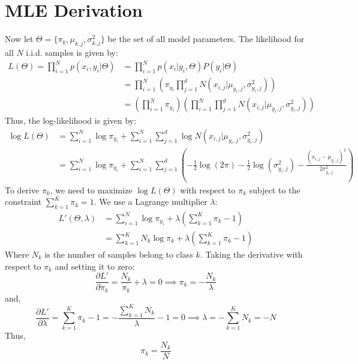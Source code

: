 \documentclass[11pt, a4paper, oneside]{memoir}
\begin{document}
\section{MLE Derivation}
Now let $\Theta = \{\pi_k, \mu_{k,j}, \sigma^2_{k,j}\}$ be the set of all model parameters.
The likelihood for all $N$ i.i.d. samples is given by:
\begin{align*}
  L(\Theta) = \prod_{i=1}^{N} p(x_i, y_i | \Theta) &= \prod_{i=1}^{N} p(x_i | y_i, \Theta) P(y_i | \Theta) \\
  &= \prod_{i=1}^{N} \left( \pi_{y_i} \prod_{j=1}^{d} N(x_{i,j} | \mu_{y_i,j}, \sigma^2_{y_i,j}) \right) \\
  &= \left( \prod_{i=1}^{N} \pi_{y_i} \right) \left( \prod_{i=1}^{N} \prod_{j=1}^{d} N(x_{i,j} | \mu_{y_i,j}, \sigma^2_{y_i,j}) \right)
\end{align*}
Thus, the log-likelihood is given by:
\begin{align*}
  \log L(\Theta) &= \sum_{i=1}^{N} \log \pi_{y_i} + \sum_{i=1}^{N} \sum_{j=1}^{d} \log N(x_{i,j} | \mu_{y_i,j}, \sigma^2_{y_i,j}) \\
  &= \sum_{i=1}^{N} \log \pi_{y_i} + \sum_{i=1}^{N} \sum_{j=1}^{d} \left( -\frac{1}{2} \log(2\pi) - \frac{1}{2} \log(\sigma^2_{y_i,j}) - \frac{(x_{i,j} - \mu_{y_i,j})^2}{2\sigma^2_{y_i,j}} \right)
\end{align*}
To derive $\pi_k$, we need to maximize $\log L(\Theta)$ with respect to $\pi_k$ subject to the constraint $\sum_{k=1}^{K} \pi_k = 1$.
We use a Lagrange multiplier $\lambda$:
\begin{align*}
  L'(\Theta, \lambda) &= \sum_{i=1}^{N} \log \pi_{y_i} + \lambda \left( \sum_{k=1}^{K} \pi_k - 1 \right) \\
  &= \sum_{k=1}^{K} N_k \log \pi_k + \lambda \left( \sum_{k=1}^{K} \pi_k - 1 \right)
\end{align*}
Where $N_k$ is the number of samples belong to class $k$.
Taking the derivative with respect to $\pi_k$ and setting it to zero:
\[ \frac{\partial L'}{\partial \pi_k} = \frac{N_k}{\pi_k} + \lambda = 0 \implies \pi_k = -\frac{N_k}{\lambda} \]
and,
\[ \frac{\partial L'}{\partial \lambda} = \sum_{k=1}^{K} \pi_k - 1 = -\frac{\sum_{k=1}^{K} N_k}{\lambda} - 1 = 0 \implies \lambda = -\sum_{k=1}^{K} N_k = -N \]
Thus,
\[ \pi_k = \frac{N_k}{N} \]
\end{document}
